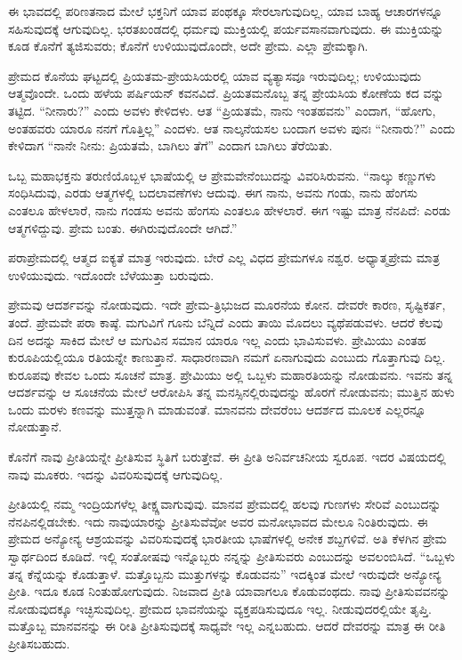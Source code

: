ಈ ಭಾವದಲ್ಲಿ ಪರಿಣತನಾದ ಮೇಲೆ ಭಕ್ತನಿಗೆ ಯಾವ ಪಂಥಕ್ಕೂ ಸೇರಲಾಗುವುದಿಲ್ಲ, ಯಾವ ಬಾಹ್ಯ ಆಚಾರಗಳನ್ನೂ ಸಹಿಸುವುದಕ್ಕೆ ಆಗುವುದಿಲ್ಲ. ಭರತಖಂಡದಲ್ಲಿ ಧರ್ಮವು ಮುಕ್ತಿಯಲ್ಲಿ ಪರ್ಯವಸಾನವಾಗುವುದು. ಈ ಮುಕ್ತಿಯನ್ನು ಕೂಡ ಕೊನೆಗೆ ತ್ಯಜಿಸುವರು; ಕೊನೆಗೆ ಉಳಿಯುವುದೊಂದೇ, ಅದೇ ಪ್ರೇಮ. ಎಲ್ಲಾ ಪ್ರೇಮಕ್ಕಾಗಿ.

ಪ್ರೇಮದ ಕೊನೆಯ ಘಟ್ಟದಲ್ಲಿ ಪ್ರಿಯತಮ-ಪ್ರೇಯಸಿಯರಲ್ಲಿ ಯಾವ ವ್ಯತ್ಯಾಸವೂ ಇರುವುದಿಲ್ಲ; ಉಳಿಯುವುದು ಆತ್ಮವೊಂದೇ. ಒಂದು ಹಳೆಯ ಪರ್ಷಿಯನ್​ ಕವನವಿದೆ. ಪ್ರಿಯತಮನೊಬ್ಬ ತನ್ನ ಪ್ರೇಯಸಿಯ ಕೋಣೆಯ ಕದ ವನ್ನು ತಟ್ಟಿದ. “ನೀನಾರು?” ಎಂದು ಅವಳು ಕೇಳಿದಳು. ಆತ “ಪ್ರಿಯತಮೆ, ನಾನು ಇಂತಹವನು” ಎಂದಾಗ, “ಹೋಗು, ಅಂತಹವರು ಯಾರೂ ನನಗೆ ಗೊತ್ತಿಲ್ಲ” ಎಂದಳು. ಆತ ನಾಲ್ಕನೆಯಸಲ ಬಂದಾಗ ಅವಳು ಪುನಃ “ನೀನಾರು?” ಎಂದು ಕೇಳಿದಾಗ “ನಾನೇ ನೀನು: ಪ್ರಿಯತಮೆ, ಬಾಗಿಲು ತೆಗೆ” ಎಂದಾಗ ಬಾಗಿಲು ತೆರೆಯಿತು.

ಒಬ್ಬ ಮಹಾಭಕ್ತನು ತರುಣಿಯೊಬ್ಬಳ ಭಾಷೆಯಲ್ಲಿ ಆ ಪ್ರೇಮವೇನೆಂಬುದನ್ನು ವಿವರಿಸಿರುವನು. “ನಾಲ್ಕು ಕಣ್ಣುಗಳು ಸಂಧಿಸಿದುವು, ಎರಡು ಆತ್ಮಗಳಲ್ಲಿ ಬದಲಾವಣೆಗಳು ಆದುವು. ಈಗ ನಾನು, ಅವನು ಗಂಡು, ನಾನು ಹೆಂಗಸು ಎಂತಲೂ ಹೇಳಲಾರೆ, ನಾನು ಗಂಡಸು ಅವನು ಹೆಂಗಸು ಎಂತಲೂ ಹೇಳಲಾರೆ. ಈಗ ಇಷ್ಟು ಮಾತ್ರ ನೆನಪಿದೆ: ಎರಡು ಆತ್ಮಗಳಿದ್ದುವು. ಪ್ರೇಮ ಬಂತು. ಈಗಿರುವುದೊಂದೇ ಆಗಿದೆ.”

ಪರಾಪ್ರೇಮದಲ್ಲಿ ಆತ್ಮದ ಐಕ್ಯತೆ ಮಾತ್ರ ಇರುವುದು. ಬೇರೆ ಎಲ್ಲ ವಿಧದ ಪ್ರೇಮಗಳೂ ನಶ್ವರ. ಅಧ್ಯಾತ್ಮಪ್ರೇಮ ಮಾತ್ರ ಉಳಿಯುವುದು. ಇದೊಂದೇ ಬೆಳೆಯುತ್ತಾ ಬರುವುದು.

ಪ್ರೇಮವು ಆದರ್ಶವನ್ನು ನೋಡುವುದು. ಇದೇ ಪ್ರೇಮ-ತ್ರಿಭುಜದ ಮೂರನೆಯ ಕೋನ. ದೇವರೇ ಕಾರಣ, ಸೃಷ್ಟಿಕರ್ತ, ತಂದೆ. ಪ್ರೇಮವೇ ಪರಾ ಕಾಷ್ಠೆ. ಮಗುವಿಗೆ ಗೂನು ಬೆನ್ನಿದೆ ಎಂದು ತಾಯಿ ಮೊದಲು ವ್ಯಥೆಪಡುವಳು. ಆದರೆ ಕೆಲವು ದಿನ ಅದನ್ನು ಸಾಕಿದ ಮೇಲೆ ಆ ಮಗುವಿನ ಸಮಾನ ಯಾರೂ ಇಲ್ಲ ಎಂದು ಭಾವಿಸುವಳು. ಪ್ರೇಮಿಯು ಎಂತಹ ಕುರೂಪಿಯಲ್ಲಿಯೂ ರತಿಯನ್ನೇ ಕಾಣುತ್ತಾನೆ. ಸಾಧಾರಣವಾಗಿ ನಮಗೆ ಏನಾಗುವುದು ಎಂಬುದು ಗೊತ್ತಾಗುವು ದಿಲ್ಲ. ಕುರೂಪವು ಕೇವಲ ಒಂದು ಸೂಚನೆ ಮಾತ್ರ. ಪ್ರೇಮಿಯು ಅಲ್ಲಿ ಒಬ್ಬಳು ಮಹಾರತಿಯನ್ನು ನೋಡುವನು. ಇವನು ತನ್ನ ಆದರ್ಶವನ್ನು ಆ ಸೂಚನೆಯ ಮೇಲೆ ಆರೋಪಿಸಿ ತನ್ನ ಮನಸ್ಸಿನಲ್ಲಿರುವುದನ್ನು ಹೊರಗೆ ನೋಡುವನು; ಮುತ್ತಿನ ಹುಳು ಒಂದು ಮರಳು ಕಣವನ್ನು ಮುತ್ತನ್ನಾಗಿ ಮಾಡುವಂತೆ. ಮಾನವನು ದೇವರೆಂಬ ಆದರ್ಶದ ಮೂಲಕ ಎಲ್ಲರನ್ನೂ ನೋಡುತ್ತಾನೆ.

ಕೊನೆಗೆ ನಾವು ಪ್ರೀತಿಯನ್ನೇ ಪ್ರೀತಿಸುವ ಸ್ಥಿತಿಗೆ ಬರುತ್ತೇವೆ. ಈ ಪ್ರೀತಿ ಅನಿರ್ವಚನೀಯ ಸ್ವರೂಪ. ಇದರ ವಿಷಯದಲ್ಲಿ ನಾವು ಮೂಕರು. ಇದನ್ನು ವಿವರಿಸುವುದಕ್ಕೆ ಆಗುವುದಿಲ್ಲ.

ಪ್ರೀತಿಯಲ್ಲಿ ನಮ್ಮ ಇಂದ್ರಿಯಗಳೆಲ್ಲ ತೀಕ್ಷ್ಣವಾಗುವುವು. ಮಾನವ ಪ್ರೇಮದಲ್ಲಿ ಹಲವು ಗುಣಗಳು ಸೇರಿವೆ ಎಂಬುದನ್ನು ನೆನಪಿನಲ್ಲಿಡಬೇಕು. ಇದು ನಾವುಯಾರನ್ನು ಪ್ರೀತಿಸುವೆವೋ ಅವರ ಮನೋಭಾವದ ಮೇಲೂ ನಿಂತಿರುವುದು. ಈ ಪ್ರೇಮದ ಅನ್ಯೋನ್ಯ ಆಶ್ರಯವನ್ನು ವಿವರಿಸುವುದಕ್ಕೆ ಭಾರತೀಯ ಭಾಷೆಗಳಲ್ಲಿ ಅನೇಕ ಶಬ್ದಗಳಿವೆ. ಅತಿ ಕೆಳಗಿನ ಪ್ರೇಮ ಸ್ವಾರ್ಥದಿಂದ ಕೂಡಿದೆ. ಇಲ್ಲಿ ಸಂತೋಷವು ಇನ್ನೊಬ್ಬರು ನನ್ನನ್ನು ಪ್ರೀತಿಸುವರು ಎಂಬುದನ್ನು ಅವಲಂಬಿಸಿದೆ. “ಒಬ್ಬಳು ತನ್ನ ಕೆನ್ನೆಯನ್ನು ಕೊಡುತ್ತಾಳೆ. ಮತ್ತೊಬ್ಬನು ಮುತ್ತುಗಳನ್ನು ಕೊಡುವನು” ಇದಕ್ಕಿಂತ ಮೇಲೆ ಇರುವುದೇ ಅನ್ಯೋನ್ಯ ಪ್ರೀತಿ. ಇದೂ ಕೂಡ ನಿಂತುಹೋಗುವುದು. ನಿಜವಾದ ಪ್ರೀತಿ ಯಾವಾಗಲೂ ಕೊಡುವಂಥದು. ನಾವು ಪ್ರೀತಿಸುವವನನ್ನು ನೋಡುವುದಕ್ಕೂ ಇಚ್ಛಿಸುವುದಿಲ್ಲ. ಪ್ರೇಮದ ಭಾವನೆಯನ್ನು ವ್ಯಕ್ತಪಡಿಸುವುದೂ ಇಲ್ಲ. ನೀಡುವುದರಲ್ಲಿಯೇ ತೃಪ್ತಿ. ಮತ್ತೊಬ್ಬ ಮಾನವನನ್ನು ಈ ರೀತಿ ಪ್ರೀತಿಸುವುದಕ್ಕೆ ಸಾಧ್ಯವೇ ಇಲ್ಲ ಎನ್ನಬಹುದು. ಆದರೆ ದೇವರನ್ನು ಮಾತ್ರ ಈ ರೀತಿ ಪ್ರೀತಿಸಬಹುದು.

